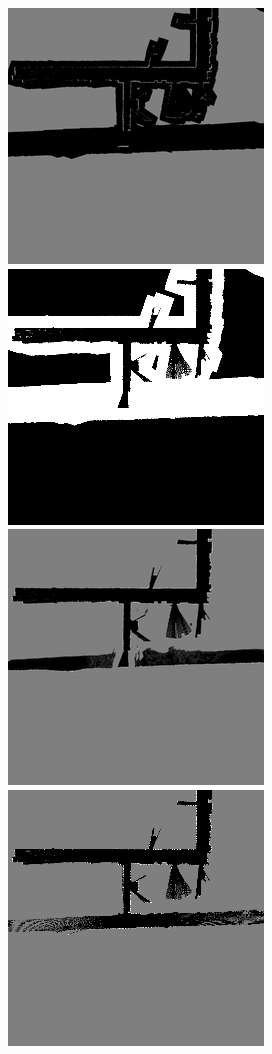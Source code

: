 \documentclass[sigconf]{aamas} %
\begin{document}
\begin{figure}[h!]%
  \def\frac{0.24}
  \includegraphics[width=\frac\linewidth]{./files/media/department_diiga/00016_input.png}%
  \includegraphics[width=\frac\linewidth]{./files/media/department_diiga/00016_mask.png}%
  \includegraphics[width=\frac\linewidth]{./files/media/department_diiga/0016_output.png}%
  \includegraphics[width=\frac\linewidth]{./files/media/department_diiga/00016_estimated.png}%

\end{figure}
\end{document}
